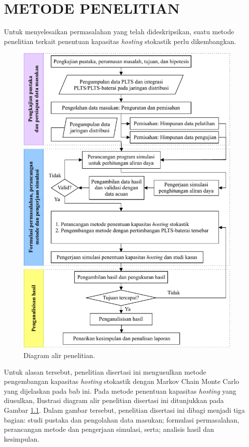 \chapter{METODE PENELITIAN}
Untuk menyelesaikan permasalahan yang telah dideskripsikan, suatu metode penelitian terkait penentuan kapasitas \textit{\textit{hosting}} stokastik perlu dikembangkan.
\begin{figure}[!t]
	\centering
	\includegraphics[width=1\textwidth]{Fig/fcpenelitian}
	\caption{Diagram alir penelitian.}
	\label{tahapan}
\end{figure}
Untuk alasan tersebut, penelitian disertasi ini mengusulkan metode pengembangan kapasitas \textit{\textit{hosting}} stokastik dengan Markov Chain Monte Carlo yang dijelaskan pada bab ini. Pada metode penentuan kapasitas \textit{\textit{hosting}} yang diusulkan, Ilustrasi diagram alir penelitian disertasi ini ditunjukkan pada Gambar \ref{tahapan}. Dalam gambar tersebut, penelitian disertasi ini dibagi menjadi tiga bagian: studi pustaka dan pengolahan data masukan; formulasi permasalahan, perancangan metode dan pengerjaan simulasi, serta; analisis hasil dan kesimpulan.

